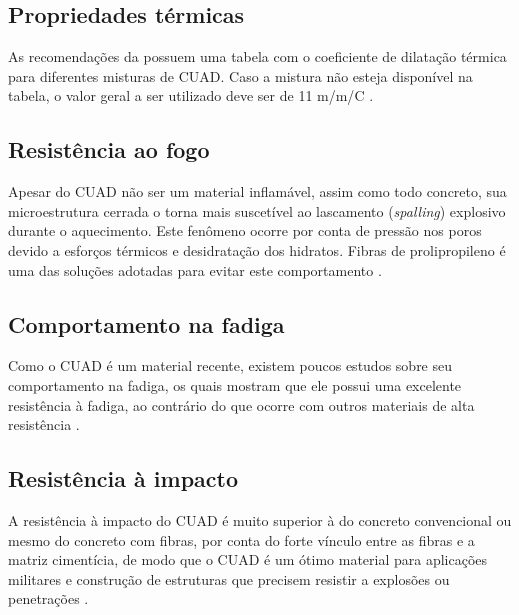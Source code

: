 
\subsection{Propriedades térmicas}

As recomendações da  possuem uma tabela com o coeficiente de dilatação térmica para diferentes misturas de CUAD. Caso a mistura não esteja disponível na tabela, o valor geral a ser utilizado deve ser de 11 {\textmu}m/m/\textsuperscript{\degree}C \cite[p.~592]{Gu}.


\subsection{Resistência ao fogo}
\label{fogo}
Apesar do CUAD não ser um material inflamável, assim como todo concreto, sua microestrutura cerrada o torna mais suscetível ao lascamento (\textit{spalling}) explosivo durante o aquecimento. Este fenômeno ocorre por conta de pressão nos poros devido a esforços térmicos e desidratação dos hidratos. Fibras de prolipropileno é uma das soluções adotadas para evitar este comportamento \cite[p.~592]{Gu}.

\subsection{Comportamento na fadiga}

Como o CUAD é um material recente, existem poucos estudos sobre seu comportamento na fadiga, os quais mostram que ele possui uma excelente resistência à fadiga, ao contrário do que ocorre com outros materiais de alta resistência \cite[p.~592]{Gu}.

\subsection{Resistência à impacto}

A resistência à impacto do CUAD é  muito superior à do concreto convencional ou mesmo do concreto com fibras, por conta do forte vínculo entre as fibras e a matriz cimentícia, de modo que o CUAD é um ótimo material para aplicações militares e construção de estruturas que precisem resistir a explosões ou penetrações \cite[p.~592]{Gu}.

